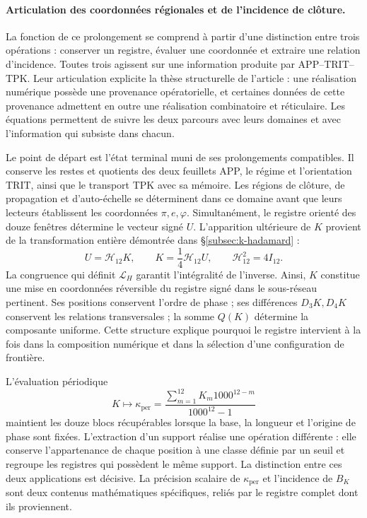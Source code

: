 \paragraph{Articulation des coordonnées régionales et de l'incidence de clôture.}
\label{inc-ampl-articulacion}
La fonction de ce prolongement se comprend à partir d'une distinction
entre trois opérations : conserver un registre, évaluer une coordonnée et
extraire une relation d'incidence. Toutes trois agissent sur une information
produite par APP--TRIT--TPK. Leur articulation explicite la thèse
structurelle de l'article : une réalisation numérique possède une provenance
opératorielle, et certaines données de cette provenance admettent en outre une
réalisation combinatoire et réticulaire. Les équations permettent de suivre les deux
parcours avec leurs domaines et avec l'information qui subsiste dans chacun.

Le point de départ est l'état terminal muni de ses prolongements
compatibles. Il conserve les restes et quotients des deux feuillets
APP, le régime et l'orientation TRIT, ainsi que le transport TPK avec sa mémoire.
Les régions de clôture, de propagation et d'auto-échelle se déterminent dans ce
domaine avant que leurs lecteurs établissent les coordonnées
$\pi,e,\varphi$. Simultanément, le registre orienté des douze
fenêtres détermine le vecteur signé $U$. L'apparition ultérieure de $K$
provient de la transformation entière démontrée dans
\S\ref{subsec:k-hadamard} :
\begin{equation}
 U=\mathcal H_{12}K,\qquad
 K=\frac14\mathcal H_{12}U,\qquad
 \mathcal H_{12}^{2}=4I_{12}.
 \label{inc-ampl-registro}
\end{equation}
La congruence qui définit $\mathcal L_H$ garantit l'intégralité de
l'inverse. Ainsi, $K$ constitue une mise en coordonnées réversible
du registre signé dans le sous-réseau pertinent. Ses positions conservent
l'ordre de phase ; ses différences $D_3K,D_4K$ conservent les relations
transversales ; la somme $Q(K)$ détermine la composante uniforme. Cette
structure explique pourquoi le registre intervient à la fois dans la composition
numérique et dans la sélection d'une configuration de frontière.

L'évaluation périodique
\[
 K\longmapsto\kappa_{\mathrm{per}}
 =\frac{\sum_{m=1}^{12}K_m1000^{12-m}}{1000^{12}-1}
\]
maintient les douze blocs récupérables lorsque la base, la longueur et
l'origine de phase sont fixées. L'extraction d'un support réalise une opération
différente : elle conserve l'appartenance de chaque position à une classe définie
par un seuil et regroupe les registres qui possèdent le même support. La
distinction entre ces deux applications est décisive. La précision
scalaire de $\kappa_{\mathrm{per}}$ et l'incidence de $B_K$ sont deux
contenus mathématiques spécifiques, reliés par le registre
complet dont ils proviennent.


